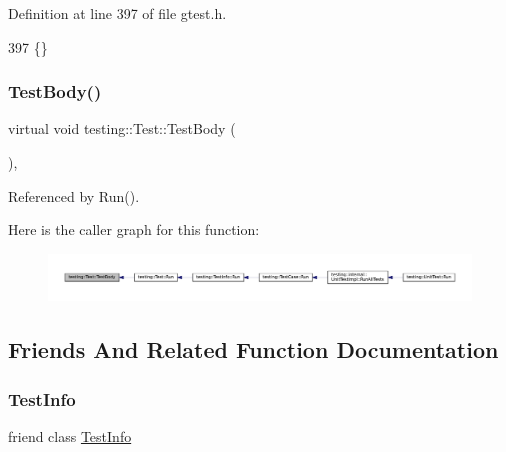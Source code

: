 Definition at line 397 of file gtest.\+h.


\begin{DoxyCode}
397 \{\}
\end{DoxyCode}
\mbox{\label{classtesting_1_1Test_a146a4a5d9854e676d625a0ef67409794}} 
\subsubsection{\texorpdfstring{Test\+Body()}{TestBody()}}
{\footnotesize\ttfamily virtual void testing\+::\+Test\+::\+Test\+Body (\begin{DoxyParamCaption}{ }\end{DoxyParamCaption})\hspace{0.3cm}{\ttfamily [private]}, {}}



Referenced by Run().

Here is the caller graph for this function\+:
\nopagebreak
\begin{figure}[H]
\begin{center}
\leavevmode
\includegraphics[width=350pt]{classtesting_1_1Test_a146a4a5d9854e676d625a0ef67409794_icgraph}
\end{center}
\end{figure}


\subsection{Friends And Related Function Documentation}
\mbox{\label{classtesting_1_1Test_a4c49c2cdb6c328e6b709b4542f23de3c}} 
\subsubsection{\texorpdfstring{Test\+Info}{TestInfo}}
{\footnotesize\ttfamily friend class \hyperlink{classtesting_1_1TestInfo}{Test\+Info}\hspace{0.3cm}{\ttfamily [friend]}}



